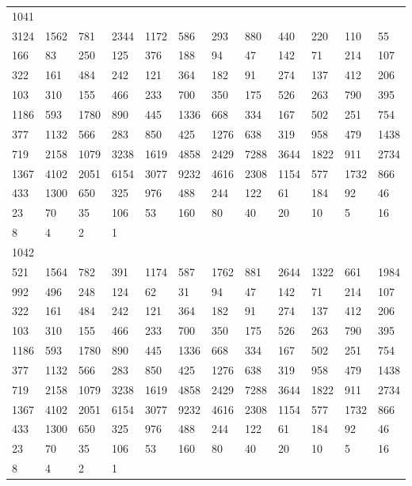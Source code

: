 \begin{longtable}{llllllllllll}
1041&&&&&&&&&&&\\
3124& 1562& 781& 2344& 1172& 586& 293& 880& 440& 220& 110& 55\\
166& 83& 250& 125& 376& 188& 94& 47& 142& 71& 214& 107\\
322& 161& 484& 242& 121& 364& 182& 91& 274& 137& 412& 206\\
103& 310& 155& 466& 233& 700& 350& 175& 526& 263& 790& 395\\
1186& 593& 1780& 890& 445& 1336& 668& 334& 167& 502& 251& 754\\
377& 1132& 566& 283& 850& 425& 1276& 638& 319& 958& 479& 1438\\
719& 2158& 1079& 3238& 1619& 4858& 2429& 7288& 3644& 1822& 911& 2734\\
1367& 4102& 2051& 6154& 3077& 9232& 4616& 2308& 1154& 577& 1732& 866\\
433& 1300& 650& 325& 976& 488& 244& 122& 61& 184& 92& 46\\
23& 70& 35& 106& 53& 160& 80& 40& 20& 10& 5& 16\\
8& 4& 2& 1& \\

1042&&&&&&&&&&&\\
521& 1564& 782& 391& 1174& 587& 1762& 881& 2644& 1322& 661& 1984\\
992& 496& 248& 124& 62& 31& 94& 47& 142& 71& 214& 107\\
322& 161& 484& 242& 121& 364& 182& 91& 274& 137& 412& 206\\
103& 310& 155& 466& 233& 700& 350& 175& 526& 263& 790& 395\\
1186& 593& 1780& 890& 445& 1336& 668& 334& 167& 502& 251& 754\\
377& 1132& 566& 283& 850& 425& 1276& 638& 319& 958& 479& 1438\\
719& 2158& 1079& 3238& 1619& 4858& 2429& 7288& 3644& 1822& 911& 2734\\
1367& 4102& 2051& 6154& 3077& 9232& 4616& 2308& 1154& 577& 1732& 866\\
433& 1300& 650& 325& 976& 488& 244& 122& 61& 184& 92& 46\\
23& 70& 35& 106& 53& 160& 80& 40& 20& 10& 5& 16\\
8& 4& 2& 1& \\


\end{longtable}

